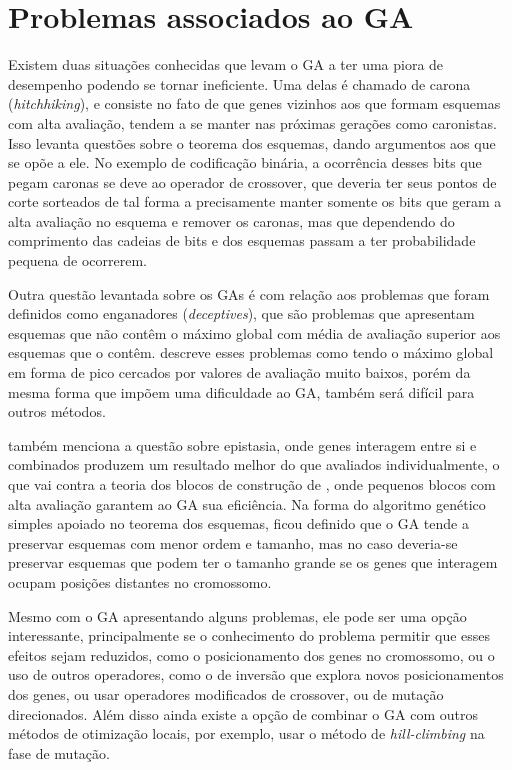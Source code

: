 \section{Problemas associados ao GA}
\label{sec:problemas_GA}
Existem duas situações conhecidas que levam o GA a ter uma piora de desempenho podendo se tornar ineficiente. Uma delas é chamado de carona (\textit{hitchhiking}), e consiste no fato de que genes vizinhos aos que formam esquemas com alta avaliação, tendem a se manter nas próximas gerações como caronistas. Isso levanta questões sobre o teorema dos esquemas, dando argumentos aos que se opõe a ele. No exemplo de codificação binária, a ocorrência desses bits que pegam caronas se deve ao operador de crossover, que deveria ter seus pontos de corte sorteados de tal forma a precisamente manter somente os bits que geram a alta avaliação no esquema e remover os caronas, mas que dependendo do comprimento das cadeias de bits e dos esquemas passam a ter probabilidade pequena de ocorrerem. 

Outra questão levantada sobre os GAs é com relação aos problemas que foram definidos como enganadores (\textit{deceptives}), que são problemas que apresentam esquemas que não contêm o máximo global com média de avaliação superior aos esquemas que o contêm. \citeauthor{Linden2008} descreve esses problemas como tendo o máximo global em forma de pico cercados por valores de avaliação muito baixos, porém da mesma forma que impõem uma dificuldade ao GA, também será difícil para outros métodos.

\citeauthor{Spall2003} também menciona a questão sobre epistasia, onde genes interagem entre si e combinados produzem um resultado melhor do que avaliados individualmente, o que vai contra a teoria dos blocos de construção de \citeauthor{Goldberg1989}, onde pequenos blocos com alta avaliação garantem ao GA sua eficiência. Na forma do algoritmo genético simples apoiado no teorema dos esquemas, ficou definido que o GA tende a preservar esquemas com menor ordem e tamanho, mas no caso deveria-se preservar esquemas que podem ter o tamanho grande se os genes que interagem ocupam posições distantes no cromossomo.

Mesmo com o GA apresentando alguns problemas, ele pode ser uma opção interessante, principalmente se o conhecimento do problema permitir que esses efeitos sejam reduzidos, como o posicionamento dos genes no cromossomo, ou o uso de outros operadores, como o de inversão que explora novos posicionamentos dos genes, ou usar operadores modificados de crossover, ou de mutação direcionados. Além disso ainda existe a opção de combinar o GA com outros métodos de otimização locais, por exemplo, usar o método de \textit{hill-climbing} na fase de mutação.
